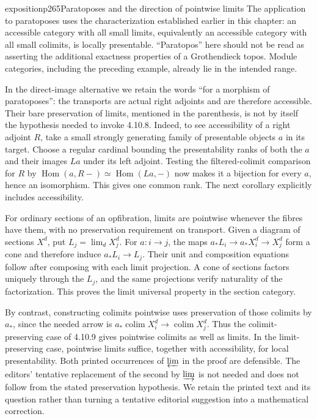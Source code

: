 \begin{dcomment}{exposition}{p265}{Paratoposes and the direction of pointwise limits}
The application to paratoposes uses the characterization established earlier in this chapter: an accessible category with all small limits, equivalently an accessible category with all small colimits, is locally presentable. ``Paratopos'' here should not be read as asserting the additional exactness properties of a Grothendieck topos. Module categories, including the preceding example, already lie in the intended range.

In the direct-image alternative we retain the words ``for a morphism of paratoposes'': the transports are actual right adjoints and are therefore accessible. Their bare preservation of limits, mentioned in the parenthesis, is not by itself the hypothesis needed to invoke 4.10.8. Indeed, to see accessibility of a right adjoint $R$, take a small strongly generating family of presentable objects $a$ in its target. Choose a regular cardinal bounding the presentability ranks of both the $a$ and their images $La$ under its left adjoint. Testing the filtered-colimit comparison for $R$ by $\operatorname{Hom}(a,R-)\simeq\operatorname{Hom}(La,-)$ now makes it a bijection for every $a$, hence an isomorphism. This gives one common rank. The next corollary explicitly includes accessibility.

For ordinary sections of an opfibration, limits are pointwise whenever the fibres have them, with no preservation requirement on transport. Given a diagram of sections $X^d$, put $L_j=\lim_d X^d_j$. For $a:i\to j$, the maps $a_*L_i\to a_*X^d_i\to X^d_j$ form a cone and therefore induce $a_*L_i\to L_j$. Their unit and composition equations follow after composing with each limit projection. A cone of sections factors uniquely through the $L_j$, and the same projections verify naturality of the factorization. This proves the limit universal property in the section category.

By contrast, constructing colimits pointwise uses preservation of those colimits by $a_*$, since the needed arrow is $a_*\operatorname{colim}X^d_i\to\operatorname{colim}X^d_j$. Thus the colimit-preserving case of 4.10.9 gives pointwise colimits as well as limits. In the limit-preserving case, pointwise limits suffice, together with accessibility, for local presentability. Both printed occurrences of $\varprojlim$ in the proof are defensible. The editors' tentative replacement of the second by $\varinjlim$ is not needed and does not follow from the stated preservation hypothesis. We retain the printed text and its question rather than turning a tentative editorial suggestion into a mathematical correction.


\end{dcomment}
